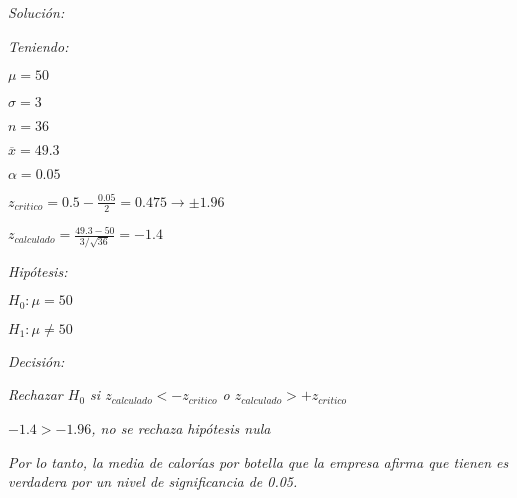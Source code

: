 \documentclass[a4paper, 12pt]{article}
\begin{document}
\emph{Solución:}

\emph{Teniendo:}

$\mu=50$

$\sigma=3$

$n=36$

$\overline{x}=49.3$

$\alpha=0.05$

$z_{critico}=0.5-\frac{0.05}{2}=0.475\to\pm 1.96$

$z_{calculado}=\frac{49.3-50}{3/\sqrt{36}}=-1.4$

\emph{Hipótesis:}

$H_0:\mu=50$

$H_1:\mu\neq 50$

\emph{Decisión:}

\emph{Rechazar $H_0$ si $z_{calculado}<-z_{critico}$ o $z_{calculado}>+z_{critico}$}

$-1.4>-1.96$\emph{, no se rechaza hipótesis nula}

\emph{Por lo tanto, la media de calorías por botella que la empresa afirma que tienen es verdadera por un nivel de significancia de 0.05.}



\nocite{*}
\end{document}

